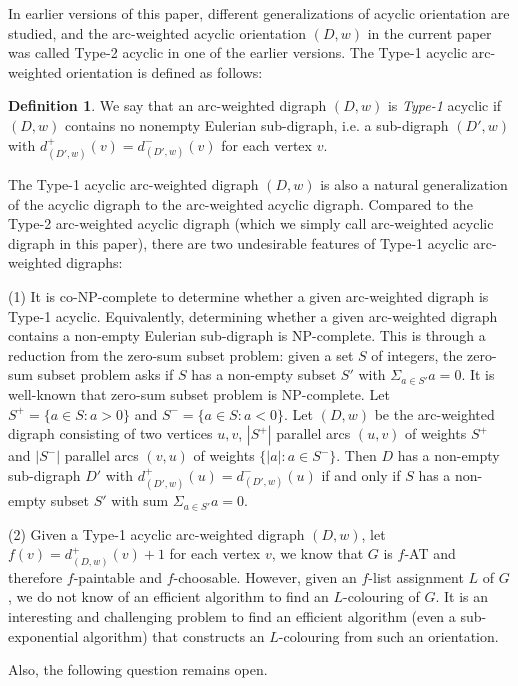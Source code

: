 \documentclass[11pt,a4paper]{article}
\theoremstyle{definition}
\newtheorem{definition}{Definition}
\begin{document}
 
In earlier versions of this paper, different generalizations of acyclic orientation are studied, and  the arc-weighted acyclic orientation $(D,w)$ in the current paper was called Type-2 acyclic in one of the earlier versions. 
The Type-1 acyclic arc-weighted orientation is defined as follows:

\begin{definition}
    \label{def-type2}
 We say that an arc-weighted digraph $(D,w)$ is \emph{Type-1} acyclic if $(D,w)$ contains no  nonempty Eulerian sub-digraph, i.e. a sub-digraph $(D', w)$ with $d_{(D',w)}^+(v) = d_{(D', w)}^-(v)$ for each vertex $v$.
\end{definition}
 
The Type-1 acyclic arc-weighted digraph $(D,w)$ is also a natural generalization of the acyclic digraph to the arc-weighted acyclic digraph. Compared to the Type-2 arc-weighted acyclic digraph (which we simply call arc-weighted acyclic digraph in this paper), there are two undesirable features of Type-1 acyclic arc-weighted digraphs:

(1) It is co-NP-complete to determine whether a given arc-weighted digraph is Type-1 acyclic. Equivalently, determining whether a given arc-weighted digraph contains a non-empty Eulerian sub-digraph is NP-complete.  This is through a reduction from the zero-sum subset problem: given a set $S$ of integers, the zero-sum subset problem asks if $S$ has a non-empty subset $S'$ with $\Sigma_{a \in S'}a=0$. It is well-known that zero-sum subset problem is NP-complete.
Let $S^+=\{a \in S: a > 0\}$ and $S^-=\{a \in S: a < 0\}$.  Let $ (D, w)$ be the arc-weighted digraph consisting of two vertices $u,v$,  $|S^+|$ parallel arcs $(u,v)$ of weights $S^+$ and $|S^-|$ parallel arcs $(v, u)$ of weights $\{|a|: a \in S^-\}$. Then $D$ has a non-empty sub-digraph $D'$ with $d_{(D',w)}^+(u) = d_{(D',w)}^-(u)$  if and only if $S$ has a non-empty subset $S'$ with sum $\Sigma_{a \in S'}a=0$. 

(2) Given a Type-1 acyclic arc-weighted digraph $(D,w)$, let $f(v)= d_{(D, w)}^+(v)+1$ for each vertex $v$, we know that $G$ is $f$-AT and therefore $f$-paintable and $f$-choosable. However, given an $f$-list assignment $L$ of $G$, we do not know of an efficient algorithm to find an $L$-colouring of $G$.   It is  an interesting and  challenging problem to find an efficient algorithm (even a sub-exponential algorithm) that constructs an $L$-colouring from such an orientation. 


Also, the following question remains open.
\end{document}
